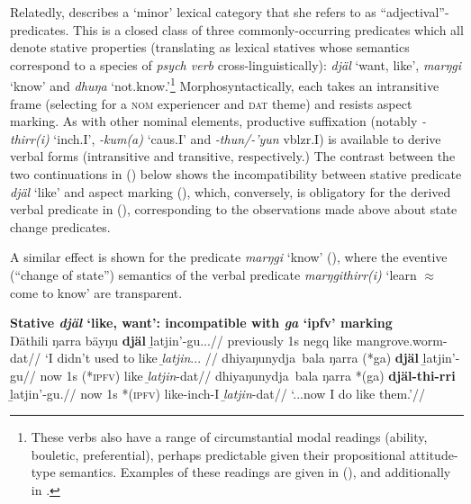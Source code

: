 Relatedly, \citet[557]{Wilkinson1991} describes a `minor' lexical category that she refers to as ``adjectival''-predicates. This is a closed class of three commonly-occurring predicates which all denote stative properties (translating as lexical statives whose semantics correspond to a species of \textit{psych verb} cross-linguistically): \textit{djäl} `want, like', \textit{marŋgi} `know' and \textit{dhuŋa} `not.know.'\footnote{These verbs also have a range of circumstantial modal readings (ability, bouletic, preferential), perhaps predictable given their propositional attitude-type semantics. Examples of these readings are given in (), and additionally in \citet[648]{Wilkinson1991}.} Morphosyntactically, each takes an intransitive frame (selecting for a \textsc{nom} experiencer and \textsc{dat} theme) and resists aspect marking. As with other nominal elements, productive suffixation (notably \textit{-thirr(i)} `\gls{inch}.\gls{I}', \textit{-kum(a)} `\gls{caus}.\gls{I}' and \textit{-thun/-'yun} \gls{vblzr}.\gls{I}) is available to derive verbal forms (intransitive and transitive, respectively.) The contrast between the two continuations in () below shows the incompatibility between stative predicate \textit{djäl} `like' and aspect marking (), which, conversely, is obligatory for the derived verbal predicate in (), corresponding to the observations made above about state change predicates.

A similar effect is shown for the predicate \textit{marŋgi} `know' (), where the eventive (``change of state'') semantics of the verbal predicate \textit{marŋgithirr(i)} `learn $ \approx $ come to know' are transparent.


\pex{}\textbf{Stative \textit{djäl} `like, want': incompatible with \textit{ga }`\gls{ipfv}' marking}\\
\begingl\gla Ŋäthili ŋarra bäyŋu \textbf{djäl} ḻatjin'-gu...//
\glb previously 1s \gls{negq} like mangrove.worm-\gls{dat}//
\glft`I didn't used to like \emph{ḻatjin}... //\endgl
\a{}\begingl\gla {} dhiyaŋunydja~bala ŋarra (*ga) \textbf{djäl} ḻatjin'-gu//
\glb now 1s (*\textsc{ipfv}) like \textit{ḻatjin}-\gls{dat}//
\endgl
\a{}\begingl\gla {} dhiyaŋunydja~bala ŋarra *(ga) \textbf{djäl-thi-rri} ḻatjin'-gu.//
\glb now 1s *(\textsc{ipfv}) like-\gls{inch}-\gls{I} \textit{ḻatjin}-\gls{dat}//
\glft`...now I do like them.'\trailingcitation{[DhG~20190417]}//\endgl
\xe





